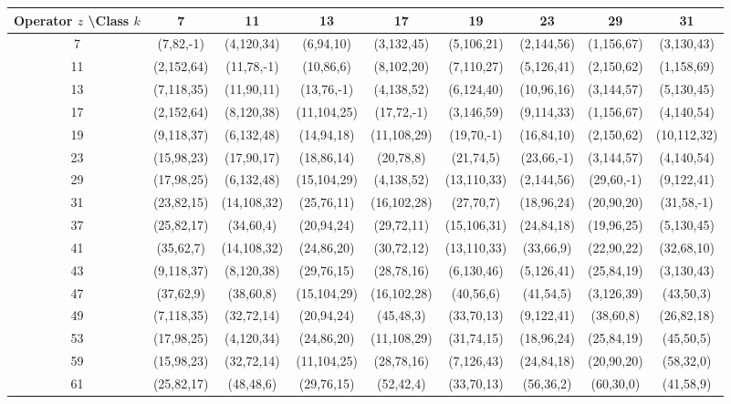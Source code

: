 \documentclass[11pt,a4paper]{article}
\begin{document}
\begin{table}[htbp]
\centering
\tiny
\begin{tabular}{c|cccccccc}
Operator \(z\) \textbackslash Class \(k\) & 7 & 11 & 13 & 17 & 19 & 23 & 29 & 31 \\
\hline
7  & (7,82,-1) & (4,120,34) & (6,94,10) & (3,132,45) & (5,106,21) & (2,144,56) & (1,156,67) & (3,130,43) \\
11 & (2,152,64) & (11,78,-1) & (10,86,6) & (8,102,20) & (7,110,27) & (5,126,41) & (2,150,62) & (1,158,69) \\
13 & (7,118,35) & (11,90,11) & (13,76,-1) & (4,138,52) & (6,124,40) & (10,96,16) & (3,144,57) & (5,130,45) \\
17 & (2,152,64) & (8,120,38) & (11,104,25) & (17,72,-1) & (3,146,59) & (9,114,33) & (1,156,67) & (4,140,54) \\
19 & (9,118,37) & (6,132,48) & (14,94,18) & (11,108,29) & (19,70,-1) & (16,84,10) & (2,150,62) & (10,112,32) \\
23 & (15,98,23) & (17,90,17) & (18,86,14) & (20,78,8) & (21,74,5) & (23,66,-1) & (3,144,57) & (4,140,54) \\
29 & (17,98,25) & (6,132,48) & (15,104,29) & (4,138,52) & (13,110,33) & (2,144,56) & (29,60,-1) & (9,122,41) \\
31 & (23,82,15) & (14,108,32) & (25,76,11) & (16,102,28) & (27,70,7) & (18,96,24) & (20,90,20) & (31,58,-1) \\
37 & (25,82,17) & (34,60,4) & (20,94,24) & (29,72,11) & (15,106,31) & (24,84,18) & (19,96,25) & (5,130,45) \\
41 & (35,62,7) & (14,108,32) & (24,86,20) & (30,72,12) & (13,110,33) & (33,66,9) & (22,90,22) & (32,68,10) \\
43 & (9,118,37) & (8,120,38) & (29,76,15) & (28,78,16) & (6,130,46) & (5,126,41) & (25,84,19) & (3,130,43) \\
47 & (37,62,9) & (38,60,8) & (15,104,29) & (16,102,28) & (40,56,6) & (41,54,5) & (3,126,39) & (43,50,3) \\
49 & (7,118,35) & (32,72,14) & (20,94,24) & (45,48,3) & (33,70,13) & (9,122,41) & (38,60,8) & (26,82,18) \\
53 & (17,98,25) & (4,120,34) & (24,86,20) & (11,108,29) & (31,74,15) & (18,96,24) & (25,84,19) & (45,50,5) \\
59 & (15,98,23) & (32,72,14) & (11,104,25) & (28,78,16) & (7,126,43) & (24,84,18) & (20,90,20) & (58,32,0) \\
61 & (25,82,17) & (48,48,6) & (29,76,15) & (52,42,4) & (33,70,13) & (56,36,2) & (60,30,0) & (41,58,9) \\

\end{tabular}
\end{table}
\end{document}
